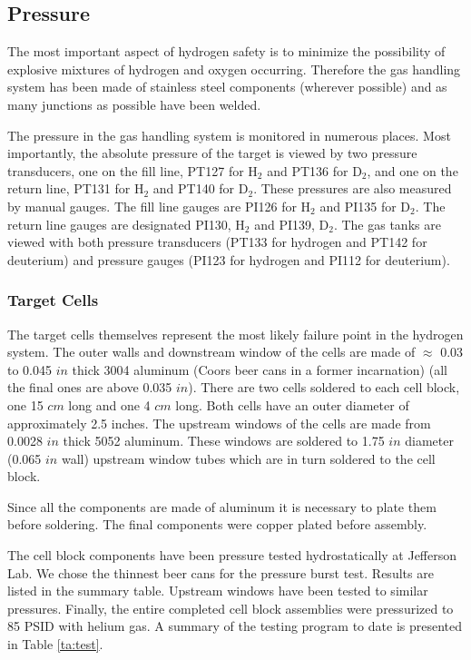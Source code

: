 \subsection{ Pressure}
\begin{safetyen}{10}{5}

The most important aspect of hydrogen safety is to minimize the
possibility of explosive mixtures of hydrogen and oxygen occurring.
Therefore the gas handling system has been made of stainless steel
components (wherever possible) and as many junctions as possible have
been welded.

The pressure in the gas handling system is monitored in numerous
places. Most importantly, the absolute pressure of the target is
viewed by two pressure transducers, one on the fill line, PT127
for H$_2$ and PT136 for D$_2$, and one on the
return line, PT131 for H$_2$ and PT140 for D$_2$.
These pressures are also measured by manual gauges. The fill line gauges
are PI126 for H$_2$ and PI135 for D$_2$. The return line
gauges are designated PI130, H$_2$ and PI139, D$_2$. The gas tanks are viewed
with both pressure transducers (PT133 for hydrogen and PT142 for deuterium)
and pressure gauges (PI123 for hydrogen and PI112 for deuterium).

\subsubsection{ Target Cells}

The target cells themselves represent the most likely failure point
in the hydrogen system. The outer walls and downstream window 
of the cells are made of
$\approx$ 0.03 to 0.045 $in$ thick 3004 aluminum (Coors beer cans in a former
incarnation) (all the final ones are above 0.035 $in$). 
There are two cells soldered to each cell block, one 15 $cm$ long
and one 4 $cm$ long. Both cells have an outer diameter of 
approximately 2.5 inches.
The upstream windows of the cells are made from 0.0028 $in$ thick 5052
aluminum.
These windows are soldered to 1.75 $in$ diameter (0.065 $in$ wall)
upstream window tubes which are in turn soldered to the cell block.

Since all the components are made of aluminum it is necessary to plate
them before soldering. The final components were copper
plated before assembly. 

The cell block components have been pressure tested hydrostatically at
Jefferson Lab.
We chose the thinnest beer cans for the pressure burst test.
 Results are listed
in the summary table.
Upstream windows have been tested
to similar pressures. Finally, the entire completed cell block
assemblies were pressurized to 85 PSID with helium gas.
A summary of the testing program to date is presented
in Table \ref{ta:test}.


\end{safetyen}
